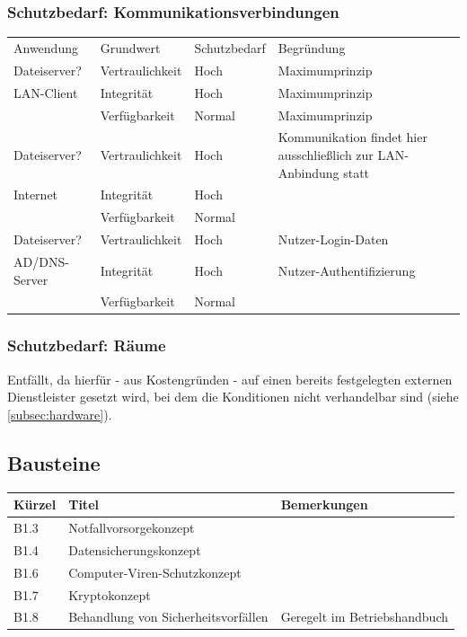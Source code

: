\subsubsection{Schutzbedarf: Kommunikationsverbindungen}
\begin{minipage}{\textwidth}
\begin{center}
\begin{tabular}{p{3.5cm}llp{6.3cm}}
\toprule
Anwendung & Grundwert & Schutzbedarf & Begründung \\
Dateiserver? & Vertraulichkeit & Hoch & Maximumprinzip \\
LAN-Client & Integrität & Hoch & Maximumprinzip \\
 & Verfügbarkeit & Normal & Maximumprinzip \\
Dateiserver? & Vertraulichkeit & Hoch & Kommunikation findet hier ausschließlich zur LAN-Anbindung statt \\
Internet & Integrität & Hoch &  \\
 & Verfügbarkeit & Normal &  \\
Dateiserver? & Vertraulichkeit & Hoch & Nutzer-Login-Daten \\
AD/DNS-Server & Integrität & Hoch & Nutzer-Authentifizierung \\
 & Verfügbarkeit & Normal &  \\
\bottomrule
\end{tabular}
\end{center}
\end{minipage}
\bigskip

\subsubsection{Schutzbedarf: Räume}
Entfällt, da hierfür - aus Kostengründen - auf einen bereits festgelegten externen Dienstleister gesetzt wird, bei dem die Konditionen nicht verhandelbar sind (siehe \ref{subsec:hardware}).

\subsection{Bausteine}
\begin{minipage}{\textwidth}
\begin{center}
\begin{tabular}{p{1cm}p{5cm}p{9cm}}
\toprule
Kürzel 	& Titel & Bemerkungen \\
\midrule
B1.3 	& Notfallvorsorgekonzept & \\
B1.4 	& Datensicherungskonzept & \\
B1.6 	& Computer-Viren-Schutzkonzept & \\
B1.7 	& Kryptokonzept	& \\
B1.8 	& Behandlung von \newline Sicherheitsvorfällen & Geregelt im Betriebshandbuch \\
\bottomrule
\end{tabular}
\end{center}
\end{minipage}
\bigskip

